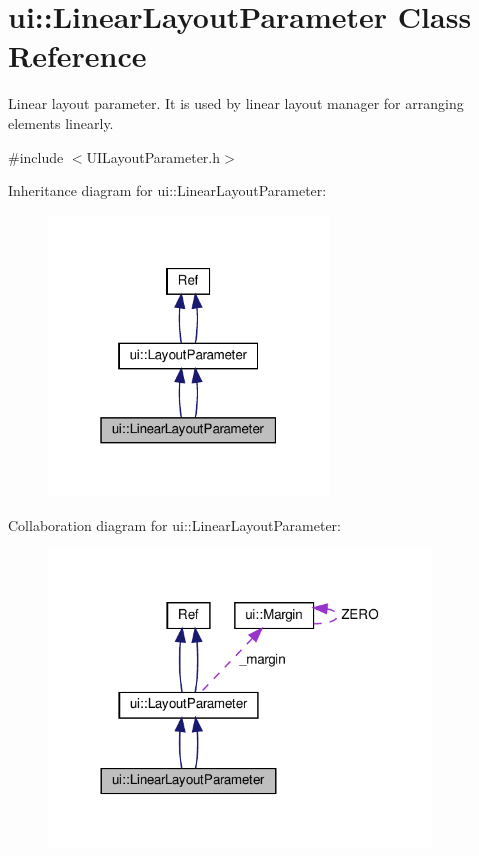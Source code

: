 \hypertarget{classui_1_1LinearLayoutParameter}{}\section{ui\+:\+:Linear\+Layout\+Parameter Class Reference}
\label{classui_1_1LinearLayoutParameter}


Linear layout parameter. It is used by linear layout manager for arranging elements linearly.  




{\ttfamily \#include $<$U\+I\+Layout\+Parameter.\+h$>$}



Inheritance diagram for ui\+:\+:Linear\+Layout\+Parameter\+:
\nopagebreak
\begin{figure}[H]
\begin{center}
\leavevmode
\includegraphics[width=211pt]{classui_1_1LinearLayoutParameter__inherit__graph}
\end{center}
\end{figure}


Collaboration diagram for ui\+:\+:Linear\+Layout\+Parameter\+:
\nopagebreak
\begin{figure}[H]
\begin{center}
\leavevmode
\includegraphics[width=288pt]{classui_1_1LinearLayoutParameter__coll__graph}
\end{center}
\end{figure}
